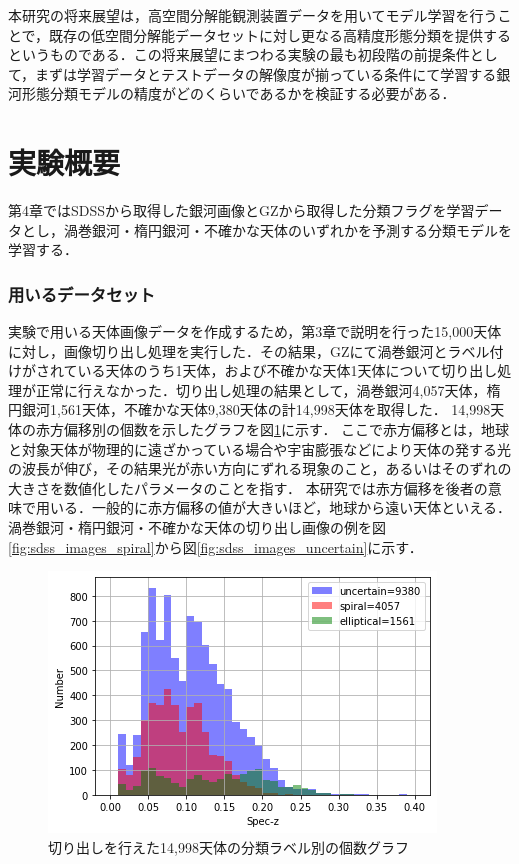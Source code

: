 \documentclass[a4j, 11pt]{jreport}
\begin{document}
本研究の将来展望は，高空間分解能観測装置データを用いてモデル学習を行うことで，既存の低空間分解能データセットに対し更なる高精度形態分類を提供するというものである．この将来展望にまつわる実験の最も初段階の前提条件として，まずは学習データとテストデータの解像度が揃っている条件にて学習する銀河形態分類モデルの精度がどのくらいであるかを検証する必要がある．

\section{実験概要}
第4章ではSDSSから取得した銀河画像とGZから取得した分類フラグを学習データとし，渦巻銀河・楕円銀河・不確かな天体のいずれかを予測する分類モデルを学習する．

\subsubsection{用いるデータセット}
実験で用いる天体画像データを作成するため，第3章で説明を行った15,000天体に対し，画像切り出し処理を実行した．その結果，GZにて渦巻銀河とラベル付けがされている天体のうち1天体，および不確かな天体1天体について切り出し処理が正常に行えなかった．切り出し処理の結果として，渦巻銀河4,057天体，楕円銀河1,561天体，不確かな天体9,380天体の計14,998天体を取得した．
14,998天体の赤方偏移別の個数を示したグラフを図\ref{fig:z_15000}に示す．
ここで赤方偏移とは，地球と対象天体が物理的に遠ざかっている場合や宇宙膨張などにより天体の発する光の波長が伸び，その結果光が赤い方向にずれる現象のこと，あるいはそのずれの大きさを数値化したパラメータのことを指す．
本研究では赤方偏移を後者の意味で用いる．一般的に赤方偏移の値が大きいほど，地球から遠い天体といえる．
渦巻銀河・楕円銀河・不確かな天体の切り出し画像の例を図\ref{fig:sdss_images_spiral}から図\ref{fig:sdss_images_uncertain}に示す．

\begin{figure}[H]
 \centering
 \includegraphics[width=1\hsize]{images/z_15000_0_040_kesson.png}
 \caption{切り出しを行えた14,998天体の分類ラベル別の個数グラフ}
 \label{fig:z_15000}
\end{figure}
\end{document}
